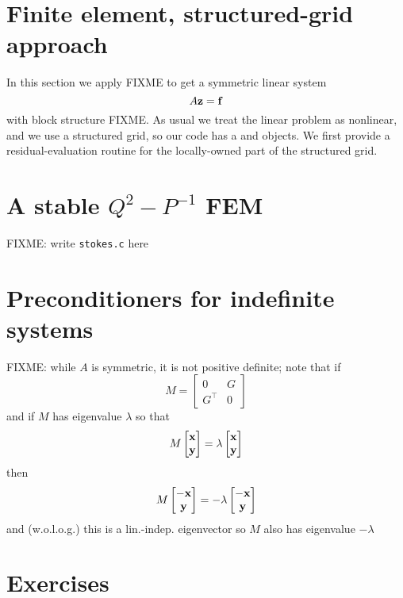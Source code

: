 \clearpage
\newpage
\section{Finite element, structured-grid approach}

In this section we apply FIXME to get a symmetric linear system
\begin{equation}
  A \mathbf{z} = \mathbf{f} \label{eq:ok:linsysstokes}
\end{equation}
with block structure FIXME.  As usual we treat the linear problem as nonlinear, and we use a structured grid, so our code has a \pSNES and \pDMDA objects.  We first provide a residual-evaluation routine for the locally-owned part of the structured grid.


\section{A stable $Q^2-P^{-1}$ FEM}

FIXME:  write \texttt{stokes.c} here


\section{Preconditioners for indefinite systems}

FIXME: while $A$ is symmetric, it is not positive definite; note that if
    $$M = \begin{bmatrix} 0 & G \\ G^\top & 0 \end{bmatrix}$$
and if $M$ has eigenvalue $\lambda$ so that
    $$M \begin{bmatrix} \mathbf{x} \\ \mathbf{y} \end{bmatrix} = \lambda \begin{bmatrix} \mathbf{x} \\ \mathbf{y} \end{bmatrix}$$
then
    $$M \begin{bmatrix} -\mathbf{x} \\ \mathbf{y} \end{bmatrix} = - \lambda \begin{bmatrix} -\mathbf{x} \\ \mathbf{y} \end{bmatrix}$$
and (w.o.l.o.g.) this is a lin.-indep. eigenvector so $M$ also has eigenvalue $-\lambda$


\section{Exercises}

